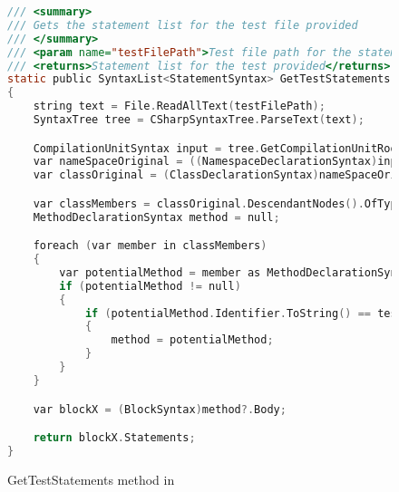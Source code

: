 \label{GetTestStatements Method}

\begin{figure}
\begin{lstlisting}[language=C]
/// <summary>
/// Gets the statement list for the test file provided
/// </summary>
/// <param name="testFilePath">Test file path for the statement list</param>
/// <returns>Statement list for the test provided</returns>
static public SyntaxList<StatementSyntax> GetTestStatements(string testFilePath, string testName)
{
	string text = File.ReadAllText(testFilePath);
	SyntaxTree tree = CSharpSyntaxTree.ParseText(text);

	CompilationUnitSyntax input = tree.GetCompilationUnitRoot();
	var nameSpaceOriginal = ((NamespaceDeclarationSyntax)input.Members[0]);
	var classOriginal = (ClassDeclarationSyntax)nameSpaceOriginal.Members[0];

	var classMembers = classOriginal.DescendantNodes().OfType<MemberDeclarationSyntax>();
	MethodDeclarationSyntax method = null;

	foreach (var member in classMembers)
	{
		var potentialMethod = member as MethodDeclarationSyntax;
		if (potentialMethod != null)
		{
			if (potentialMethod.Identifier.ToString() == testName)
			{
				method = potentialMethod;
			}
		}
	}

	var blockX = (BlockSyntax)method?.Body;

	return blockX.Statements;
}
\end{lstlisting}
\caption{GetTestStatements method in \mytool}
\label{fig:GetTestStatements1}
\end{figure}
